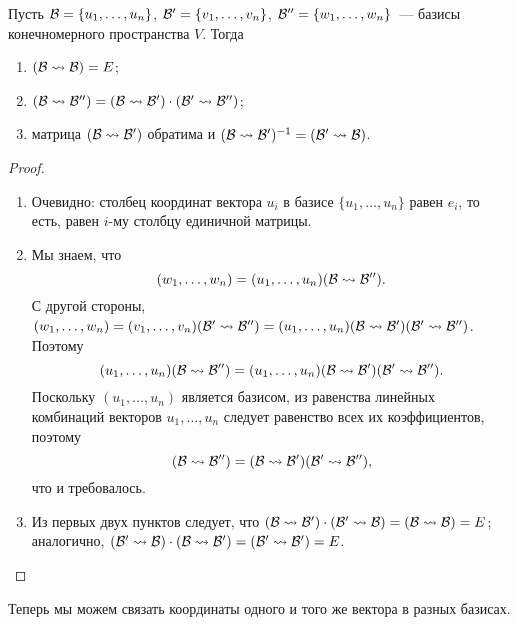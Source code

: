 \begin{proposition}
Пусть $\mathcal B=\{u_1,\dots,u_n\}$, $\mathcal B'=\{v_1,\dots,v_n\}$,
$\mathcal B''=\{w_1,\dots,w_n\}$~--- базисы конечномерного пространства
$V$. Тогда
\begin{enumerate}
\item $(\mathcal B\rightsquigarrow\mathcal B)=E$;
\item $(\mathcal B\rightsquigarrow\mathcal B'')=(\mathcal B\rightsquigarrow\mathcal B')\cdot (\mathcal B'\rightsquigarrow\mathcal B'')$;
\item матрица $(\mathcal B\rightsquigarrow\mathcal B')$ обратима и
$(\mathcal B\rightsquigarrow\mathcal B')^{-1}=(\mathcal B'\rightsquigarrow\mathcal B)$.
\end{enumerate}
\end{proposition}
\begin{proof}
\begin{enumerate}
\item Очевидно: столбец координат вектора $u_i$ в базисе
  $\{u_1,\dots,u_n\}$ равен $e_i$, то есть, равен $i$-му столбцу
  единичной матрицы.
\item Мы знаем, что $$(w_1,\dots,w_n)=(u_1,\dots,u_n)(\mathcal B\rightsquigarrow\mathcal
  B'').$$
С другой стороны, $(w_1,\dots,w_n) = (v_1,\dots,v_n)(\mathcal B'\rightsquigarrow\mathcal B'')
= (u_1,\dots,u_n)(\mathcal B\rightsquigarrow\mathcal B')(\mathcal B'\rightsquigarrow\mathcal B'')$.
Поэтому
$$
(u_1,\dots,u_n)(\mathcal B\rightsquigarrow\mathcal B'') = (u_1,\dots,u_n)(\mathcal B\rightsquigarrow\mathcal
B')(\mathcal B'\rightsquigarrow\mathcal B'').
$$
Поскольку $(u_1,\dots,u_n)$ является базисом, из равенства линейных
комбинаций векторов $u_1,\dots,u_n$ следует равенство всех их
коэффициентов, поэтому
$$
(\mathcal B\rightsquigarrow\mathcal B'') = (\mathcal B\rightsquigarrow\mathcal B')(\mathcal B'\rightsquigarrow\mathcal B''),
$$
что и требовалось.
\item Из первых двух пунктов следует, что $(\mathcal B\rightsquigarrow\mathcal B')\cdot(\mathcal
  B'\rightsquigarrow\mathcal B) = (\mathcal B\rightsquigarrow\mathcal B) = E$; аналогично, $(\mathcal B'\rightsquigarrow\mathcal
  B)\cdot(\mathcal B\rightsquigarrow\mathcal B') = (\mathcal B'\rightsquigarrow\mathcal B') = E$.
\end{enumerate}
\end{proof}

Теперь мы можем связать координаты одного и того же вектора в разных
базисах.


